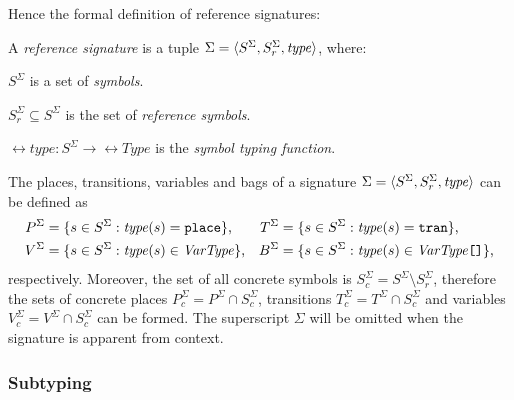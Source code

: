 Hence the formal definition of reference  signatures:

\begin{dfn}
  A \emph{reference   signature} is a tuple \(\Sigma = \langle S^\Sigma, S_r^\Sigma, \textrm{\itshape type\/} \rangle\), where:
  \begin{compactitem}
  \item \(S^\Sigma\) is a set of \emph{symbols}.
  \item \(S_r^\Sigma \subseteq S^\Sigma\) is the set of \emph{reference symbols}.
  \item \(\rel{type}\colon S^\Sigma \to \rel{Type}\) is the \emph{symbol typing function}.
  \end{compactitem}
\end{dfn}

The places, transitions, variables and bags of a signature \(\Sigma = \langle S^\Sigma, S_r^\Sigma, \textrm{\itshape type\/} \rangle\) can be defined as
\begin{align}
  P^\Sigma &= \{s \in S^\Sigma : \textrm{\itshape type\/}(s) = \texttt{\upshape place}\}\text,
  &T^\Sigma &= \{s \in S^\Sigma : \textrm{\itshape type\/}(s) = \texttt{\upshape tran}\}\text, \\
  V^\Sigma &= \{s \in S^\Sigma : \textrm{\itshape type\/}(s) \in \textrm{\itshape VarType\/}\}\text,
  &B^\Sigma &= \{s \in S^\Sigma : \textrm{\itshape type\/}(s) \in \textrm{\itshape VarType\/}\mathclose{\texttt{[]}}\}\text,
\end{align}
respectively. Moreover, the set of all concrete symbols is \(S_c^\Sigma = S^\Sigma \setminus S_r^\Sigma\),
therefore the sets of concrete places \(P^\Sigma_c = P^\Sigma \cap S_c^\Sigma\), transitions \(T^\Sigma_c = T^\Sigma \cap S_c^\Sigma\) and variables \(V^\Sigma_c = V^\Sigma \cap S_c^\Sigma\) can be formed. The superscript \(\Sigma\) will be omitted when the signature is apparent from context.

\subsubsection{Subtyping}

